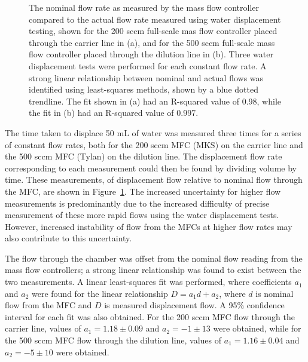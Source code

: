 \documentclass[
  a4paper,
]{scrbook}
\begin{document}
\begin{figure}
\begin{minipage}[t]{0.47\linewidth}
{}

\end{minipage}%

\caption{\label{fig-MFC-calibration-curves}The nominal flow rate as
measured by the mass flow controller compared to the actual flow rate
measured using water displacement testing, shown for the 200 sccm
full-scale mas flow controller placed through the carrier line in (a),
and for the 500 sccm full-scale mass flow controller placed through the
dilution line in (b). Three water displacement tests were performed for
each constant flow rate. A strong linear relationship between nominal
and actual flows was identified using least-squares methods, shown by a
blue dotted trendline. The fit shown in (a) had an R-squared value of
0.98, while the fit in (b) had an R-squared value of 0.997.}

\end{figure}

The time taken to displace 50 mL of water was measured three times for a
series of constant flow rates, both for the 200 sccm MFC (MKS) on the
carrier line and the 500 sccm MFC (Tylan) on the dilution line. The
displacement flow rate corresponding to each measurement could then be
found by dividing volume by time. These measurements, of displacement
flow relative to nominal flow through the MFC, are shown in
Figure~\ref{fig-MFC-calibration-curves}. The increased uncertainty for
higher flow measurements is predominantly due to the increased
difficulty of precise measurement of these more rapid flows using the
water displacement tests. However, increased instability of flow from
the MFCs at higher flow rates may also contribute to this uncertainty.

The flow through the chamber was offset from the nominal flow reading
from the mass flow controllers; a strong linear relationship was found
to exist between the two measurements. A linear least-squares fit was
performed, where coefficients \(a_1\) and \(a_2\) were found for the
linear relationship \(D = a_1d + a_2\), where \(d\) is nominal flow from
the MFC and \(D\) is measured displacement flow. A 95\% confidence
interval for each fit was also obtained. For the 200 sccm MFC flow
through the carrier line, values of \(a_1 = 1.18\pm0.09\) and
\(a_2 = -1\pm13\) were obtained, while for the 500 sccm MFC flow through
the dilution line, values of \(a_1 = 1.16\pm0.04\) and \(a_2 = -5\pm10\)
were obtained.
\end{document}

